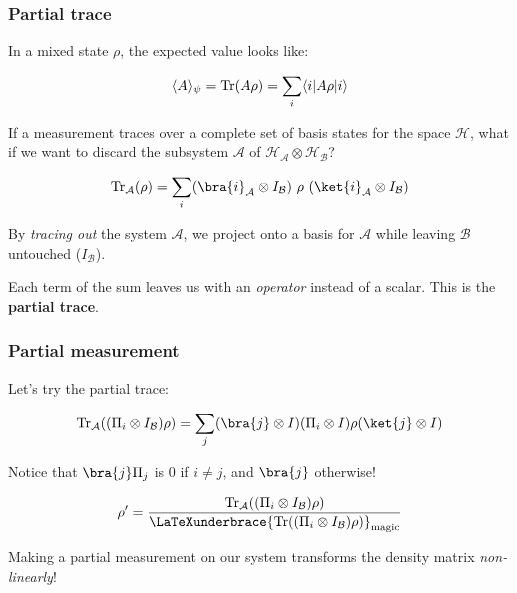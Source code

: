 









\begin{frame}
  \frametitle{Partial trace}

  In a mixed state $\rho$, the expected value looks like:

  \[ \langle A \rangle_\psi = \operatorname{Tr}(A \rho) = \sum_i \langle i | A \rho | i \rangle \]

  If a measurement traces over a complete set of basis states for the space
  $\mathcal{H}$, what if we want to discard the subsystem $\mathcal{A}$ of
  $\mathcal{H}_{\mathcal{A}} \otimes \mathcal{H}_{\mathcal{B}}$?

  \[ \Tr_{\mathcal{A}}(\rho) =
  \sum_i (\bra{i}_{\mathcal{A}} \otimes I_{\mathcal{B}})
  \ \rho\ (\ket{i}_{\mathcal{A}} \otimes I_{\mathcal{B}})\]

  By \emph{tracing out} the system $\mathcal{A}$, we project onto a basis for
  $\mathcal{A}$ while leaving $\mathcal{B}$ untouched ($I_{\mathcal{B}}$).

  Each term of the sum leaves us with an \emph{operator} instead of a scalar.
  This is the \textbf{partial trace}\autocite{quic06}.

\end{frame}

\begin{frame}
  \frametitle{Partial measurement}

  Let's try the partial trace:

 \[\Tr_{\mathcal{A}}((\Pi_i \otimes I_{\mathcal{B}}) \rho)
    = \sum_j (\bra{j} \otimes I) (\Pi_i \otimes I) \rho (\ket{j} \otimes I)\]

  Notice that $\bra{j} \Pi_j$ is $0$ if $i\neq j$, and $\bra{j}$ otherwise!

  \[ \rho' = \frac{\Tr_{\mathcal{A}}((\Pi_i\otimes I_{\mathcal{B}}) \rho)}
    {\LaTeXunderbrace{ \Tr((\Pi_i\otimes I_{\mathcal{B}})\rho) }_{\text{magic}}}\]

  Making a partial measurement on our system transforms the density matrix
  \emph{non-linearly}!

\end{frame}

